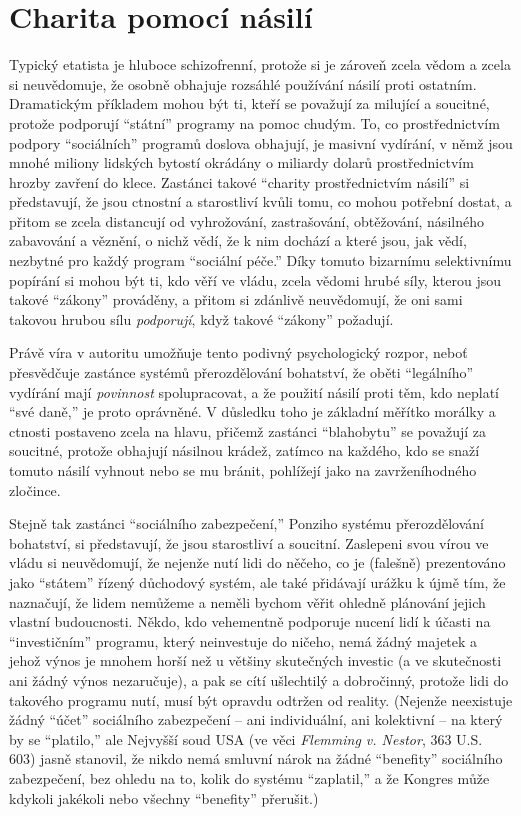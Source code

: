 \documentclass{book}
\begin{document}
\section{Charita pomocí násilí}

Typický etatista je hluboce schizofrenní, protože si je zároveň zcela vědom a zcela si neuvědomuje, že osobně obhajuje rozsáhlé používání násilí proti ostatním. Dramatickým příkladem mohou být ti, kteří se považují za milující a soucitné, protože podporují \enquote{státní} programy na pomoc chudým. To, co prostřednictvím podpory \enquote{sociálních} programů doslova obhajují, je masivní vydírání, v němž jsou mnohé miliony lidských bytostí okrádány o miliardy dolarů prostřednictvím hrozby zavření do klece. Zastánci takové \enquote{charity prostřednictvím násilí} si představují, že jsou ctnostní a starostliví kvůli tomu, co mohou potřební dostat, a přitom se zcela distancují od vyhrožování, zastrašování, obtěžování, násilného zabavování a věznění, o nichž vědí, že k nim dochází a které jsou, jak vědí, nezbytné pro každý program \enquote{sociální péče.} Díky tomuto bizarnímu selektivnímu popírání si mohou být ti, kdo věří ve vládu, zcela vědomi hrubé síly, kterou jsou takové \enquote{zákony} prováděny, a přitom si zdánlivě neuvědomují, že oni sami takovou hrubou sílu \emph{podporují}, když takové \enquote{zákony} požadují.

Právě víra v autoritu umožňuje tento podivný psychologický rozpor, neboť přesvědčuje zastánce systémů přerozdělování bohatství, že oběti \enquote{legálního} vydírání mají \emph{povinnost} spolupracovat, a že použití násilí proti těm, kdo neplatí \enquote{své daně,} je proto oprávněné. V důsledku toho je základní měřítko morálky a ctnosti postaveno zcela na hlavu, přičemž zastánci \enquote{blahobytu} se považují za soucitné, protože obhajují násilnou krádež, zatímco na každého, kdo se snaží tomuto násilí vyhnout nebo se mu bránit, pohlížejí jako na zavrženíhodného zločince.

Stejně tak zastánci \enquote{sociálního zabezpečení,} Ponziho systému přerozdělování bohatství, si představují, že jsou starostliví a soucitní. Zaslepeni svou vírou ve vládu si neuvědomují, že nejenže nutí lidi do něčeho, co je (falešně) prezentováno jako \enquote{státem} řízený důchodový systém, ale také přidávají urážku k újmě tím, že naznačují, že lidem nemůžeme a neměli bychom věřit ohledně plánování jejich vlastní budoucnosti. Někdo, kdo vehementně podporuje nucení lidí k účasti na \enquote{investičním} programu, který neinvestuje do ničeho, nemá žádný majetek a jehož výnos je mnohem horší než u většiny skutečných investic (a ve skutečnosti ani žádný výnos nezaručuje), a pak se cítí ušlechtilý a dobročinný, protože lidi do takového programu nutí, musí být opravdu odtržen od reality. (Nejenže neexistuje žádný \enquote{účet} sociálního zabezpečení -- ani individuální, ani kolektivní -- na který by se \enquote{platilo,} ale Nejvyšší soud USA (ve věci \emph{Flemming v. Nestor}, 363 U.S. 603) jasně stanovil, že nikdo nemá smluvní nárok na žádné \enquote{benefity} sociálního zabezpečení, bez ohledu na to, kolik do systému \enquote{zaplatil,} a že Kongres může kdykoli jakékoli nebo všechny \enquote{benefity} přerušit.)
\end{document}
